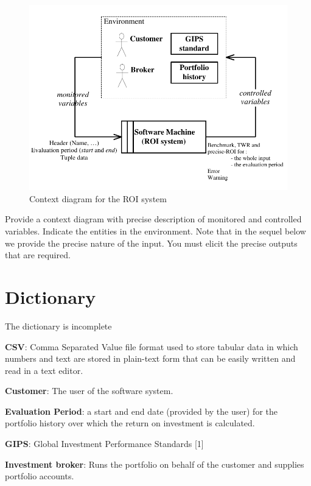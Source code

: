 \documentclass[runningheads,12pt]{article}
\begin{document}
\begin{figure}
\centering
\includegraphics[scale=1.0]{inputs/context.pdf}
\caption{Context diagram for the ROI system}
\label{fig:ROI-context}
\end{figure}

{\color{red} Provide a context diagram with precise description of monitored and controlled variables. Indicate the entities in the environment. Note that in the sequel below we provide the precise nature of the input. You must elicit the precise outputs that are required.}

\section{Dictionary}

The dictionary is incomplete

\smallskip

\noindent\textbf{CSV}: Comma Separated Value file format used to store tabular data in which numbers and text are stored in plain-text form that can be easily written and read in a text editor.\smallskip

\noindent\textbf{Customer}: The user of the software system.\smallskip

\noindent\textbf{Evaluation Period}: a start and end date (provided by the user) for the portfolio history over which the return on investment is calculated.\smallskip

\noindent\textbf{GIPS}: Global Investment Performance Standards [1]\smallskip

\noindent\textbf{Investment broker}: Runs the portfolio on behalf of the customer and supplies portfolio accounts.\smallskip
\end{document}

